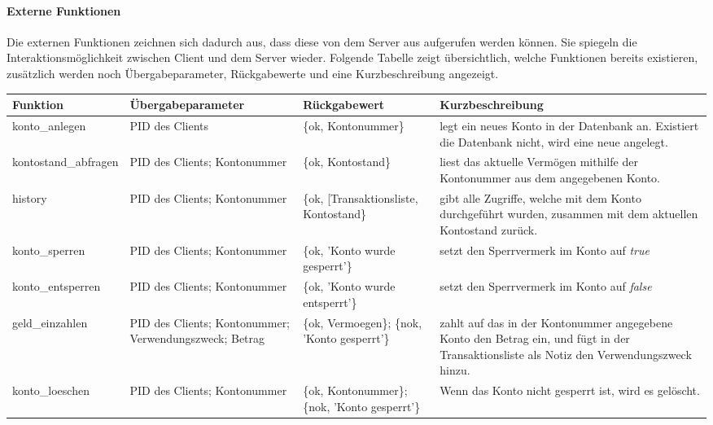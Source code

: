 \paragraph{Externe Funktionen}
Die externen Funktionen zeichnen sich dadurch aus, dass diese von dem Server aus aufgerufen werden können. Sie spiegeln die Interaktionsmöglichkeit zwischen Client und dem Server wieder. Folgende Tabelle zeigt übersichtlich, welche Funktionen bereits existieren, zusätzlich werden noch Übergabeparameter, Rückgabewerte und eine Kurzbeschreibung angezeigt.
\\
\begin{center}
\begin{tabular}{p{3 cm}|p{3 cm}|p{3 cm}|p{5 cm}}
Funktion & Übergabeparameter & Rückgabewert & Kurzbeschreibung \\
				\hline
				\hline
konto\_anlegen & 
PID des Clients & 
\{ok, Kontonummer\} & 
legt ein neues Konto in der Datenbank an. Existiert die Datenbank nicht, wird eine neue angelegt.\\ \hline

kontostand\_abfragen & 
PID des Clients; Kontonummer & 
\{ok, Kontostand\} & 
liest das aktuelle Vermögen mithilfe der Kontonummer aus dem angegebenen Konto.\\ \hline

history & 
PID des Clients; Kontonummer & 
\{ok, [Transaktionsliste, Kontostand\} & 
gibt alle Zugriffe, welche mit dem Konto durchgeführt wurden, zusammen mit dem aktuellen Kontostand zurück.\\ \hline

konto\_sperren & 
PID des Clients; Kontonummer & 
\{ok, 'Konto wurde gesperrt'\} & 
setzt den Sperrvermerk im Konto auf \textit{true}\\ \hline

konto\_entsperren & 
PID des Clients; Kontonummer & 
\{ok, 'Konto wurde entsperrt'\} & 
setzt den Sperrvermerk im Konto auf \textit{false}\\ \hline

geld\_einzahlen & 
PID des Clients; Kontonummer; Verwendungszweck; Betrag & 
\{ok, Vermoegen\}; \{nok, 'Konto gesperrt'\} & 
zahlt auf das in der Kontonummer angegebene Konto den Betrag ein, und fügt in der Transaktionsliste als Notiz den Verwendungszweck hinzu.\\ \hline

konto\_loeschen & 
PID des Clients; Kontonummer & 
\{ok, Kontonummer\}; \{nok, 'Konto gesperrt'\} & 
Wenn das Konto nicht gesperrt ist, wird es gelöscht.\\ \hline


\end{tabular}
\end{center}
